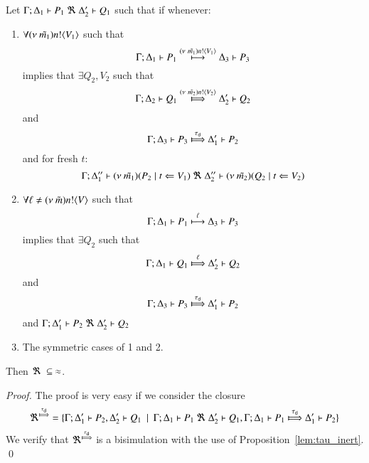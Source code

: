 \begin{lemma}\rm
	\label{lem:up_to_deterministic_transition}
	Let $\Gamma; \Delta_1 \vdash P_1 \ \Re\  \Delta_2' \vdash Q_1$ such
	that if whenever:
%
	\begin{enumerate}
		\item	$\forall (\nu\ \tilde{m_1}) n ! \langle V_1 \rangle$ such that
			\[
				\Gamma; \Delta_1 \vdash P_1 \stackrel{(\nu\ \tilde{m_1}) n ! \langle V_1 \rangle}{\longmapsto} \Delta_3 \vdash P_3
			\]
			implies that $\exists Q_2, V_2$ such that
			\[
				\horel{\Gamma}{\Delta_2}{Q_1}{\Hby{\news{\tilde{m_2}} \bactout{n}{V_2}}}{\Delta_2'}{Q_2}
			\]
			and
			\[
				\horel{\Gamma}{\Delta_3}{P_3}{\Hby{\dtau}}{\Delta_1'}{P_2}
			\]
			and for fresh $t$:
			\[
				\Gamma; \Delta_1'' \vdash (\nu\ \tilde{m_1})(P_2 \;|\; t \Leftarrow V_1) \ \Re\  \Delta_2'' \vdash{(\nu\ \tilde{m_2})(Q_2 \;|\;t \Leftarrow V_2)}
			\]
%
		\item	$\forall \ell \not= (\nu\ \tilde{m}) n ! \langle V \rangle$ such that
			\[
				\Gamma; \Delta_1 \vdash P_1 \stackrel{\ell}{\longmapsto} \Delta_3 \vdash P_3
			\]
			implies that $\exists Q_2$ such that 
			\[
				\horel{\Gamma}{\Delta_1}{Q_1}{\Hby{\ell}}{\Delta_2'}{Q_2}
			\]
			and
			\[
				\horel{\Gamma}{\Delta_3}{P_3}{\Hby{\dtau}}{\Delta_1'}{P_2}
			\]
			and
			$\Gamma; \Delta_1' \vdash P_2 \ \Re\  \Delta_2' \vdash Q_2$

		\item	The symmetric cases of 1 and 2.
	\end{enumerate}
	Then $\Re\ \subseteq\ \approx$.
\end{lemma}


\begin{proof}
	The proof is very easy if we consider the
	closure
	\[
		\Re^{\Hby{\dtau}} = \set{ \horel{\Gamma}{\Delta_1'}{P_2}{,}{\Delta_2'}{Q_1} \setbar \horel{\Gamma}{\Delta_1}{P_1}{\ \Re\ }{\Delta_2'}{Q_1},
		\horel{\Gamma}{\Delta_1}{P_1}{\Hby{\dtau}}{\Delta_1'}{P_2} }
	\]
	We verify that $\Re^{\Hby{\dtau}}$ is a bisimulation with
	the use of Proposition~\ref{lem:tau_inert}.
	\qed
\end{proof}
